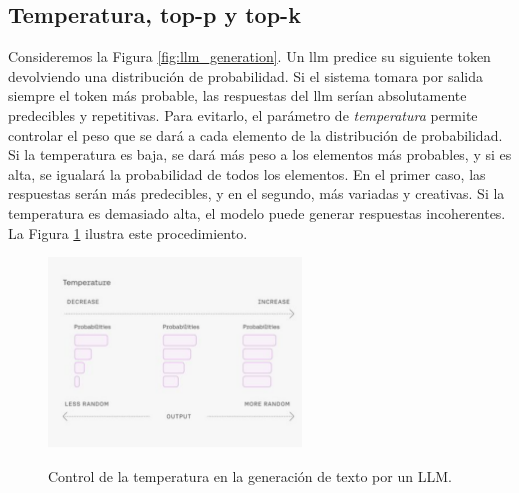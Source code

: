 \subsection{Temperatura, top-p y top-k}
\label{sec:hiperparametros_controlables}

Consideremos la Figura \ref{fig:llm_generation}. Un \gls{llm} predice su siguiente token devolviendo una distribución de probabilidad. Si el sistema tomara por salida siempre el token más probable, las respuestas del \gls{llm} serían absolutamente predecibles y repetitivas. Para evitarlo, el parámetro de \emph{temperatura} permite controlar el peso que se dará a cada elemento de la distribución de probabilidad. Si la temperatura es baja, se dará más peso a los elementos más probables, y si es alta, se igualará la probabilidad de todos los elementos. En el primer caso, las respuestas serán más predecibles, y en el segundo, más variadas y creativas. Si la temperatura es demasiado alta, el modelo puede generar respuestas incoherentes. La Figura \ref{fig:temperatura} ilustra este procedimiento.

\begin{figure}[H]
    \caption[Control de la temperatura en la generación de texto por un LLM]{Control de la temperatura en la generación de texto por un LLM.}
    \centering
    \includegraphics[width=0.6\textwidth]{./figuras/temperatura.png}
    \label{fig:temperatura}
\end{figure}

